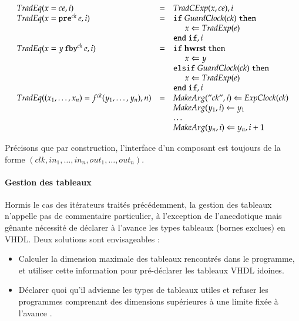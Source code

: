 \documentclass[9pt,a4paper]{article}
\newcommand{\mybox}[1]{\mbox{\tt{#1}}}
\newcommand{\ind}[0]{\hspace{0.5cm}}
\newcommand{\Fby}[2]{#1 \, \mybox{fby}^{ck} \, #2}
\newcommand{\Pre}[1]{\mybox{pre}^{ck} \, #1}
\newcommand{\App}[2]{#1^{ck}(#2)}
\newcommand{\Assign}[2]{#1 \Leftarrow #2}
\begin{document}
\[
\begin{array}{lcl}
  \TradEq{x = ce}{i} & = & \TradCE{x}{ce}, i \\

  \TradEq{x = \Pre{e}}{i} & = & \mathtt{if} \; \GEC{ck} \; \mathtt{then} \\
  & & \ind \Assign{x}{\TradE{e}} \\
  & & \mathtt{end} \; \mathtt{if}, i \\

  \TradEq{x = \Fby{y}{e}}{i} & = & \mathtt{if} \; \mathbf{hwrst}
  \; \mathtt{then} \\
  & & \ind \Assign{x}{y} \\
  & & \mathtt{elsif} \; \GEC{ck} \; \mathtt{then} \\
  & & \ind \Assign{x}{\TradE{e}} \\
  & & \mathtt{end} \; \mathtt{if}, i \\


  \TradEq{(x_1,\dots,x_n) = \App{f}{y_1,\dots,y_n}}{n} & = &
  \Assign{\MA{"ck"}{i}}{\EC{ck}} \\
  & & \Assign{\MA{y_1}{i}}{y_1} \\
  & & \dots \\
  & & \Assign{\MA{y_n}{i}}{y_n}, i + 1 \\
\end{array}
\]

Précisons que par construction, l'interface d'un composant est toujours de la
forme $(clk, in_1, \dots,in_n, out_1,\dots,out_n)$.

\paragraph{Gestion des tableaux}

Hormis le cas des itérateurs traités précédemment, la gestion des tableaux
n'appelle pas de commentaire particulier, à l'exception de l'anecdotique mais
gênante nécessité de déclarer à l'avance les types tableaux (bornes exclues) en
VHDL. Deux solutions sont envisageables :

\begin{itemize}
\item Calculer la dimension maximale des tableaux rencontrés dans le programme,
  et utiliser cette information pour pré-déclarer les tableaux VHDL idoines.
\item Déclarer quoi qu'il advienne les types de tableaux utiles et refuser les
  programmes comprenant des dimensions supérieures à une limite fixée à l'avance
  .
\end{itemize}
\end{document}
